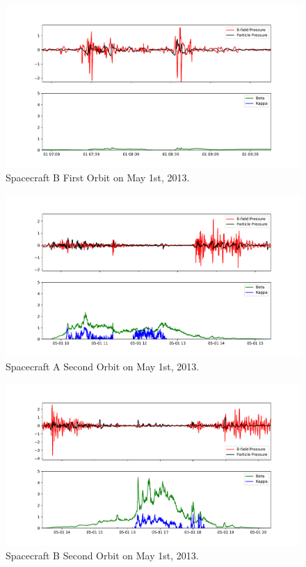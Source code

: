 \documentclass{report}
\begin{document}
\begin{figure}
\includegraphics[scale=.45]{B_Orbit2_1.pdf}
\caption{Spacecraft B First Orbit on May 1st, 2013.}
\end{figure}

\begin{figure}
\includegraphics[scale=.45]{A_Orbit2.pdf}
\caption{Spacecraft A Second Orbit on May 1st, 2013.}
\end{figure}

\begin{figure}
\includegraphics[scale=.45]{B_Orbit3.pdf}
\caption{Spacecraft B Second Orbit on May 1st, 2013.}
\end{figure}
\end{document}
